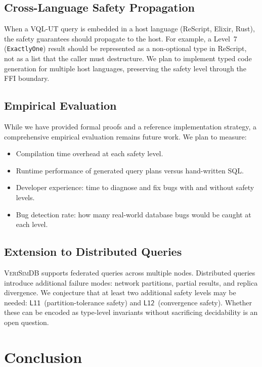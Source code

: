 \documentclass[11pt,a4paper]{article}
\newcommand{\VQL}{\textsc{VQL-UT}}
\newcommand{\VeriSimDB}{\textsc{VeriSimDB}}
\newcommand{\LevelN}[1]{\textsf{L#1}}
\begin{document}
\subsection{Cross-Language Safety Propagation}

When a \VQL{} query is embedded in a host language (ReScript, Elixir,
Rust), the safety guarantees should propagate to the host.  For
example, a Level~7 (\texttt{ExactlyOne}) result should be represented
as a non-optional type in ReScript, not as a list that the caller
must destructure.  We plan to implement typed code generation for
multiple host languages, preserving the safety level through the FFI
boundary.

\subsection{Empirical Evaluation}

While we have provided formal proofs and a reference implementation
strategy, a comprehensive empirical evaluation remains future work.
We plan to measure:
\begin{itemize}[nosep]
  \item Compilation time overhead at each safety level.
  \item Runtime performance of generated query plans versus hand-written SQL.
  \item Developer experience: time to diagnose and fix bugs with and
    without safety levels.
  \item Bug detection rate: how many real-world database bugs would be
    caught at each level.
\end{itemize}

\subsection{Extension to Distributed Queries}

\VeriSimDB{} supports federated queries across multiple nodes.
Distributed queries introduce additional failure modes: network
partitions, partial results, and replica divergence.  We conjecture
that at least two additional safety levels may be needed:
$\LevelN{11}$~(partition-tolerance safety) and
$\LevelN{12}$~(convergence safety).  Whether these can be encoded
as type-level invariants without sacrificing decidability is an
open question.

\section{Conclusion}\label{sec:conclusion}
\end{document}
